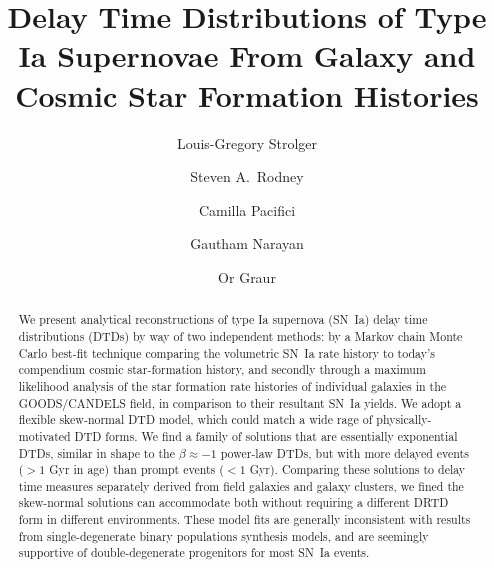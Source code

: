 \documentclass[apj, twocolumn]{aastex62}
\begin{document}
\title{Delay Time Distributions of Type Ia Supernovae From Galaxy and Cosmic Star Formation Histories}
\author[0000-0002-7756-4440]{Louis-Gregory Strolger}

\author{Steven A.~Rodney}

\author{Camilla Pacifici}

\author{Gautham Narayan}

\author{Or Graur}

\begin{abstract}
We present analytical reconstructions of type Ia supernova (SN~Ia) delay time distributions (DTDs) by way of two independent methods: by a Markov chain Monte Carlo best-fit technique comparing the volumetric SN~Ia rate history to today's compendium cosmic star-formation history, and secondly through a maximum likelihood analysis of the star formation rate histories of individual galaxies in the GOODS/CANDELS field, in comparison to their resultant SN~Ia yields. {We adopt a flexible skew-normal DTD model, which could match a wide rage of physically-motivated DTD forms.} We find a family of solutions that are essentially exponential DTDs, similar in shape to the $\beta\approx-1$ power-law DTDs, but with more delayed events ($>1$ Gyr in age) than prompt events ($<1$ Gyr). {Comparing these solutions to delay time measures separately derived from field galaxies and galaxy clusters, we fined the skew-normal solutions can accommodate both without requiring a different DRTD form in different environments}. These model {fits} are generally inconsistent with results from single-degenerate binary populations synthesis models, and are seemingly supportive of double-degenerate progenitors for most SN~Ia events. 

\end{abstract}
\end{document}
